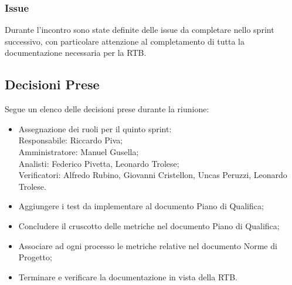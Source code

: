 \documentclass[10pt]{article}
\begin{document}
\subsubsection{Issue}
Durante l'incontro sono state definite delle issue da completare nello sprint successivo, con particolare attenzione al completamento
di tutta la documentazione necessaria per la RTB.

\subsection{Decisioni Prese}
Segue un elenco delle decisioni prese durante la riunione:
\begin{itemize}
    \item   Assegnazione dei ruoli per il quinto sprint:\\
            Responsabile: Riccardo Piva;\\
            Amministratore: Manuel Gusella;\\
            Analisti: Federico Pivetta, Leonardo Trolese;\\
            Verificatori: Alfredo Rubino, Giovanni Cristellon, Uncas Peruzzi, Leonardo Trolese.\\
    \item Aggiungere i test da implementare al documento Piano di Qualifica;
    \item Concludere il cruscotto delle metriche nel documento Piano di Qualifica;
    \item Associare ad ogni processo le metriche relative nel documento Norme di Progetto;
    \item Terminare e verificare la documentazione in vista della RTB.
\end{itemize}
\end{document}
